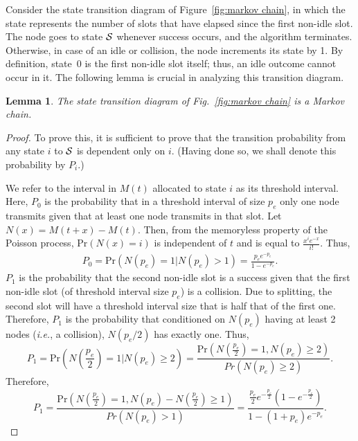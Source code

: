 \documentclass[12pt,draftcls,peerreview, onecolumn]{IEEEtran}
\newtheorem{lemma}{{\bf Lemma}}
\newcommand{\brac}[1]{\left({#1}\right)}
\newcommand{\ie}{{\it i.e.}}
\newcommand{\prob}[1]{\text{Pr}\brac{#1}}
\newcommand{\success}{{\cal S}}
\newcommand{\PI}[1]{P_{#1}}
\begin{document}
  Consider the state transition diagram of Figure~\ref{fig:markov
    chain}, in which the state represents the number of slots that
  have elapsed since the first non-idle slot. The node goes to state
  $\success$ whenever success occurs, and the algorithm terminates.
  Otherwise, in case of an idle or collision, the node increments its
  state by 1. By definition, state~$0$ is the first non-idle slot
  itself; thus, an idle outcome cannot occur in it. The following
  lemma is crucial in analyzing this transition diagram.
\begin{lemma}
The state transition diagram of Fig.~\ref{fig:markov chain} is a Markov chain.
\label{lem:markov}
\end{lemma}
\begin{proof}
To prove this, it is sufficient to prove that the
  transition probability from any state $i$ to $\success$ is dependent
  only on $i$. (Having done so, we shall denote this probability by $\PI{i}$.)

  
  We refer to the interval in $M(t)$ allocated to state $i$ as its
  threshold interval.  Here, $P_{0}$ is the probability that in a
  threshold interval of size $p_e$ only one node transmits given that
  at least one node transmits in that slot. Let $N(x)=M(t+x)-M(t)$.
  Then, from the memoryless property of the Poisson process,
  $\prob{N(x)=i}$ is independent of $t$ and is equal to $\frac{x^i
    e^{-x}}{i!}$. Thus,
\begin{align}
 P_0 =\prob{N(p_e)=1 \Big| N(p_e) > 1} = \frac{p_e e^{-p_e}}{1-e^{-p_e}}.
 \end{align}
$\PI{1}$ is the probability that the second non-idle slot is a
 success given that the first non-idle slot (of threshold interval
 size $p_e$) is a collision. Due to splitting, the second slot will
 have a threshold interval size that is half that of the first one.
 Therefore, $\PI{1}$ is the probability that conditioned on $N(p_e)$
 having at least 2 nodes (\ie, a collision), $N(p_e/2)$ has exactly
 one. Thus,
\begin{equation}
  \PI{1}=\prob{N\left(\frac{p_e}{2}\right)=1 \Big| N(p_e) \geq 2}
 =\frac{\prob{N\left(\frac{p_e}{2}\right)=1 , N(p_e) \geq 2}}{Pr(N(p_e) \geq 2)}.
\end{equation}
Therefore,
\begin{equation}
            \PI{1} = \frac{\prob{N\left(\frac{p_e}{2}\right)=1 , N(p_e)- N\left(\frac{p_e}{2}\right)\ge1}}{Pr(N(p_e) > 1)}
             = \frac{ \frac{p_e}{2} e^{-\frac{p_e}{2} }(1-e^{-\frac{p_e}{2} })}{1-(1+p_e )e^{-p_e }}.
  \end{equation}


\end{proof}
\end{document}
